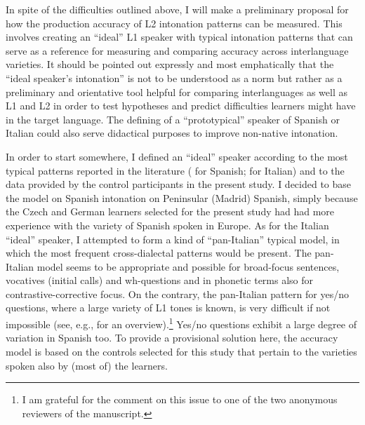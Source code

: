 In spite of the difficulties outlined above, I will make a preliminary proposal for how the production accuracy of L2 intonation patterns can be measured. This involves creating an “ideal” L1 speaker with typical intonation patterns that can serve as a reference for measuring and comparing accuracy across interlanguage varieties. It should be pointed out expressly and most emphatically that the “ideal speaker’s intonation” is not to be understood as a norm but rather as a preliminary and orientative tool helpful for comparing interlanguages as well as L1 and L2 in order to test hypotheses and predict difficulties learners might have in the target language. The defining of a “prototypical” speaker of Spanish or Italian could also serve didactical purposes to improve non-native intonation.


In order to start somewhere, I defined an “ideal” speaker according to the most typical patterns reported in the literature (\citealt{HualdePrieto2015} for Spanish; \citealt{GiliFivelaEtAl2015} for Italian) and to the data provided by the control participants in the present study. I decided to base the model on Spanish intonation on Peninsular (Madrid) Spanish, simply because the Czech and German learners selected for the present study had had more experience with the variety of Spanish spoken in Europe. As for the Italian “ideal” speaker, I attempted to form a kind of “pan-Italian” typical model, in which the most frequent cross-dialectal patterns would be present. The pan-Italian model seems to be appropriate and possible for broad-focus sentences, vocatives (initial calls) and wh-questions and in phonetic terms also for contrastive-corrective focus. On the contrary, the pan-Italian pattern for yes/no questions, where a large variety of L1 tones is known, is very difficult if not impossible (see, e.g., \citealt{GiliFivelaEtAl2015} for an overview).\footnote{I am grateful for the comment on this issue to one of the two anonymous reviewers of the manuscript.} Yes/no questions exhibit a large degree of variation in Spanish too. To provide a provisional solution here, the accuracy model is based on the controls selected for this study that pertain to the varieties spoken also by (most of) the learners.



